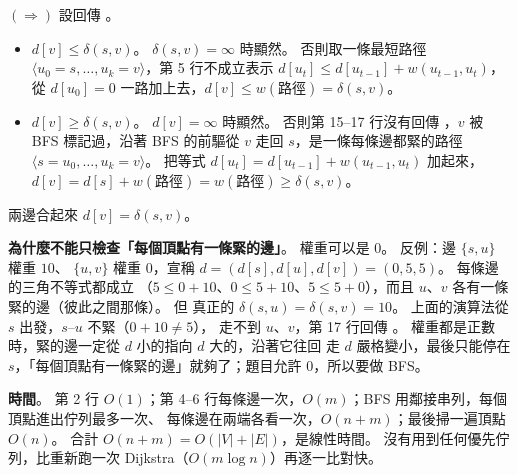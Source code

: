 \begin{pastsoln}
$(\Rightarrow)$ 設回傳 \TRUE。
\begin{itemize}
\item \textbf{$d[v] \le \delta(s, v)$}。 $\delta(s, v) = \infty$ 時顯然。 否則取一條最短路徑
$\langle u_0 = s, \ldots, u_k = v \rangle$，第 5 行不成立表示 $d[u_t] \le d[u_{t-1}] + w(u_{t-1}, u_t)$，
從 $d[u_0] = 0$ 一路加上去，$d[v] \le w(\text{路徑}) = \delta(s, v)$。
\item \textbf{$d[v] \ge \delta(s, v)$}。 $d[v] = \infty$ 時顯然。 否則第 15--17 行沒有回傳 \FALSE，$v$ 被
BFS 標記過，沿著 BFS 的前驅從 $v$ 走回 $s$，是一條每條邊都緊的路徑 $\langle s = u_0, \ldots, u_k = v \rangle$。
把等式 $d[u_t] = d[u_{t-1}] + w(u_{t-1}, u_t)$ 加起來，$d[v] = d[s] + w(\text{路徑}) = w(\text{路徑})
\ge \delta(s, v)$。
\end{itemize}
兩邊合起來 $d[v] = \delta(s, v)$。

\textbf{為什麼不能只檢查「每個頂點有一條緊的邊」}。 權重可以是 $0$。 反例：邊 $\{s, u\}$ 權重 $10$、
$\{u, v\}$ 權重 $0$，宣稱 $d = (d[s], d[u], d[v]) = (0, 5, 5)$。 每條邊的三角不等式都成立
（$5 \le 0 + 10$、$0 \le 5 + 10$、$5 \le 5 + 0$），而且 $u$、$v$ 各有一條緊的邊（彼此之間那條）。 但
真正的 $\delta(s, u) = \delta(s, v) = 10$。 上面的演算法從 $s$ 出發，$s$--$u$ 不緊（$0 + 10 \ne 5$），
走不到 $u$、$v$，第 17 行回傳 \FALSE。 權重都是正數時，緊的邊一定從 $d$ 小的指向 $d$ 大的，沿著它往回
走 $d$ 嚴格變小，最後只能停在 $s$，「每個頂點有一條緊的邊」就夠了；題目允許 $0$，所以要做 BFS。

\textbf{時間}。 第 2 行 $O(1)$；第 4--6 行每條邊一次，$O(m)$；BFS 用鄰接串列，每個頂點進出佇列最多一次、
每條邊在兩端各看一次，$O(n + m)$；最後掃一遍頂點 $O(n)$。 合計 $O(n + m) = O(|V| + |E|)$，是線性時間。
沒有用到任何優先佇列，比重新跑一次 Dijkstra（$O(m \log n)$）再逐一比對快。
\end{pastsoln}
